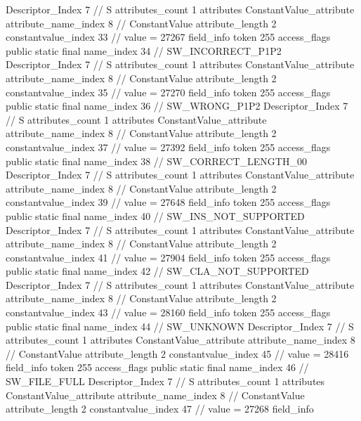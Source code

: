 {{{{{				Descriptor_Index	7		// S
				attributes_count	1
				attributes {
				ConstantValue_attribute {
					attribute_name_index	8		// ConstantValue
					attribute_length	2
					constantvalue_index	33		// value = 27267
				}
				}
			}
			field_info {
				token	255
				access_flags	public static final
				name_index	34		// SW_INCORRECT_P1P2
				Descriptor_Index	7		// S
				attributes_count	1
				attributes {
				ConstantValue_attribute {
					attribute_name_index	8		// ConstantValue
					attribute_length	2
					constantvalue_index	35		// value = 27270
				}
				}
			}
			field_info {
				token	255
				access_flags	public static final
				name_index	36		// SW_WRONG_P1P2
				Descriptor_Index	7		// S
				attributes_count	1
				attributes {
				ConstantValue_attribute {
					attribute_name_index	8		// ConstantValue
					attribute_length	2
					constantvalue_index	37		// value = 27392
				}
				}
			}
			field_info {
				token	255
				access_flags	public static final
				name_index	38		// SW_CORRECT_LENGTH_00
				Descriptor_Index	7		// S
				attributes_count	1
				attributes {
				ConstantValue_attribute {
					attribute_name_index	8		// ConstantValue
					attribute_length	2
					constantvalue_index	39		// value = 27648
				}
				}
			}
			field_info {
				token	255
				access_flags	public static final
				name_index	40		// SW_INS_NOT_SUPPORTED
				Descriptor_Index	7		// S
				attributes_count	1
				attributes {
				ConstantValue_attribute {
					attribute_name_index	8		// ConstantValue
					attribute_length	2
					constantvalue_index	41		// value = 27904
				}
				}
			}
			field_info {
				token	255
				access_flags	public static final
				name_index	42		// SW_CLA_NOT_SUPPORTED
				Descriptor_Index	7		// S
				attributes_count	1
				attributes {
				ConstantValue_attribute {
					attribute_name_index	8		// ConstantValue
					attribute_length	2
					constantvalue_index	43		// value = 28160
				}
				}
			}
			field_info {
				token	255
				access_flags	public static final
				name_index	44		// SW_UNKNOWN
				Descriptor_Index	7		// S
				attributes_count	1
				attributes {
				ConstantValue_attribute {
					attribute_name_index	8		// ConstantValue
					attribute_length	2
					constantvalue_index	45		// value = 28416
				}
				}
			}
			field_info {
				token	255
				access_flags	public static final
				name_index	46		// SW_FILE_FULL
				Descriptor_Index	7		// S
				attributes_count	1
				attributes {
				ConstantValue_attribute {
					attribute_name_index	8		// ConstantValue
					attribute_length	2
					constantvalue_index	47		// value = 27268
				}
				}
			}
			field_info {
}}}}}
